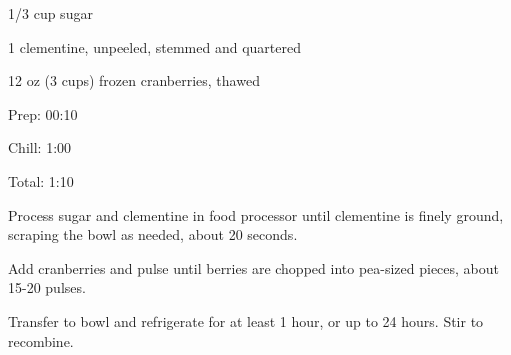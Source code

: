 \documentclass[oneside]{book}  %
\def\thisrecipe{}  %
\newcommand{\recipe}[1]{\section{#1}\def\thisrecipe{: #1}} %
\begin{document}
\begin{IT}
  \begin{ingredients}
    \item[1/3 cup] sugar 
    \item[1] clementine, unpeeled, stemmed and quartered
    \item[12 oz (3 cups)] frozen cranberries, thawed
  \end{ingredients}

  \switchcolumn

  \begin{timeline}
    \item[Prep:]   00:10
    \item[Chill:]  1:00
    \item[Total:]  1:10
  \end{timeline}
\end{IT}

\begin{directions}
  \item Process sugar and clementine in food processor until clementine is
  finely ground, scraping the bowl as needed, about 20 seconds.

  \item Add cranberries and pulse until berries are chopped into pea-sized
  pieces, about 15-20 pulses.

  \item Transfer to bowl and refrigerate for at least 1 hour, or up to 24 hours.
  Stir to recombine.
\end{directions}

\end{document}
